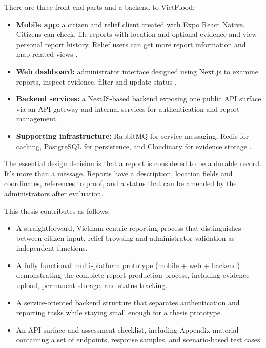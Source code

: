 There are three front-end parts and a backend to VietFlood:
\begin{itemize}
    \item \textbf{Mobile app:} a citizen and relief client created with Expo React Native. Citizens can check, file reports with location and optional evidence and view personal report history. Relief users can get more report information and map-related views \cite{expoDocs,reactNativeDocs}.
    \item \textbf{Web dashboard:} administrator interface designed using Next.js to examine reports, inspect evidence, filter and update status \cite{nextjsDocs}.
    \item \textbf{Backend services:} a NestJS-based backend exposing one public API surface via an API gateway and internal services for authentication and report management \cite{nestjsDocs,nestjsMicroservicesDocs}.
    \item \textbf{Supporting infrastructure:} RabbitMQ for service messaging, Redis for caching, PostgreSQL for persistence, and Cloudinary for evidence storage \cite{rabbitmqConfirmsDocs,redisDocs,postgresqlJsonDocs,cloudinaryUploadDocs}.
\end{itemize}

The essential design decision is that a report is considered to be a durable record. It's more than a message. Reports have a description, location fields and coordinates, references to proof, and a status that can be amended by the administrators after evaluation.

This thesis contributes as follows:
\begin{itemize}
    \item A straightforward, Vietnam-centric reporting process that distinguishes between citizen input, relief browsing and administrator validation as independent functions.
    \item A fully functional multi-platform prototype (mobile + web + backend) demonstrating the complete report production process, including evidence upload, permanent storage, and status tracking.
    \item A service-oriented backend structure that separates authentication and reporting tasks while staying small enough for a thesis prototype.
    \item An API surface and assessment checklist, including Appendix material containing a set of endpoints, response samples, and scenario-based test cases.
\end{itemize}

